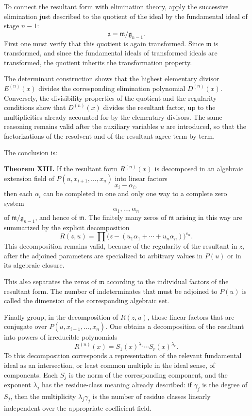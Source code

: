 \documentclass[11pt]{article}
\begin{document}
To connect the resultant form with elimination theory, apply the successive elimination just described to the quotient of the ideal by the fundamental ideal of stage $n-1$:
\[
  \mathfrak a=\mathfrak m/\mathfrak g_{n-1}.
\]
First one must verify that this quotient is again transformed. Since $\mathfrak m$ is transformed, and since the fundamental ideals of transformed ideals are transformed, the quotient inherits the transformation property.

The determinant construction shows that the highest elementary divisor $E^{(n)}(x)$ divides the corresponding elimination polynomial $D^{(n)}(x)$. Conversely, the divisibility properties of the quotient and the regularity conditions show that $D^{(n)}(x)$ divides the resultant factor, up to the multiplicities already accounted for by the elementary divisors. The same reasoning remains valid after the auxiliary variables $u$ are introduced, so that the factorizations of the resolvent and of the resultant agree term by term.

The conclusion is:

\textbf{Theorem XIII.} If the resultant form $R^{(n)}(x)$ is decomposed in an algebraic extension field of $P(u,x_{i+1},\ldots,x_n)$ into linear factors
\[
  x_i-\alpha_i,
\]
then each $\alpha_i$ can be completed in one and only one way to a complete zero system
\[
  \alpha_1,
\ldots,\alpha_n
\]
of $\mathfrak m/\mathfrak g_{n-1}$, and hence of $\mathfrak m$. The finitely many zeros of $\mathfrak m$ arising in this way are summarized by the explicit decomposition
\begin{equation}
  R(z,u)=\prod\bigl(z-(u_1\alpha_1+
\cdots+u_n\alpha_n)\bigr)^{e_\alpha}.           \tag{37}
\end{equation}
This decomposition remains valid, because of the regularity of the resultant in $z$, after the adjoined parameters are specialized to arbitrary values in $P(u)$ or in its algebraic closure.

This also separates the zeros of $\mathfrak m$ according to the individual factors of the resultant form. The number of indeterminates that must be adjoined to $P(u)$ is called the dimension of the corresponding algebraic set.

Finally group, in the decomposition of $R(z,u)$, those linear factors that are conjugate over $P(u,x_{i+1},\ldots,x_n)$. One obtains a decomposition of the resultant into powers of irreducible polynomials
\[
  R^{(n)}(x)=S_1(x)^{\lambda_1}\cdots S_r(x)^{\lambda_r}.
\]
To this decomposition corresponds a representation of the relevant fundamental ideal as an intersection, or least common multiple in the ideal sense, of components. Each $S_j$ is the norm of the corresponding component, and the exponent $\lambda_j$ has the residue-class meaning already described: if $\gamma_j$ is the degree of $S_j$, then the multiplicity $\lambda_j\gamma_j$ is the number of residue classes linearly independent over the appropriate coefficient field.
\end{document}
